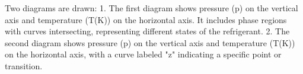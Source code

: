 Two diagrams are drawn:  
1. The first diagram shows pressure (p) on the vertical axis and temperature (T(K)) on the horizontal axis. It includes phase regions with curves intersecting, representing different states of the refrigerant.  
2. The second diagram shows pressure (p) on the vertical axis and temperature (T(K)) on the horizontal axis, with a curve labeled "z" indicating a specific point or transition.
